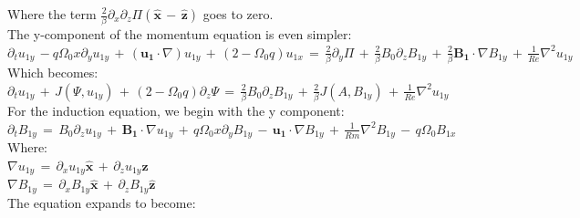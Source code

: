 \documentclass[letterpaper,12pt]{article}
\newcommand\reye{\mathrel{Re}}
\newcommand\reym{\mathrel{Rm}}
\begin{document}
Where the term $\frac{2}{\beta}\partial_x\partial_z\Pi \left(\mathbf{\hat{x}} \, - \, \mathbf{\hat{z}}\right)$ goes to zero. \\

The y-component of the momentum equation is even simpler: \\

$\partial_t u_{1y} \, - q\Omega_0 x \partial_y u_{1y} \, + \, \left(\mathbf{u_1} \cdot \nabla \right)u_{1y} \, + \, \left(2 - \Omega_0 q\right) u_{1x} \, = \, \frac{2}{\beta} \partial_y \Pi \, + \, \frac{2}{\beta} B_0 \partial_z B_{1y} \, + \, \frac{2}{\beta}\mathbf{B_1} \cdot \nabla B_{1y} \, + \, \frac{1}{\reye}\nabla^2 u_{1y}$ \\

Which becomes: \\

$\partial_t u_{1y} \, + \, J\left(\Psi, u_{1y}\right) \, + \, \left(2 - \Omega_0 q\right) \partial_z \Psi \, = \, \frac{2}{\beta}B_0\partial_z B_{1y} \, + \, \frac{2}{\beta} J\left(A, B_{1y}\right) \, + \, \frac{1}{\reye} \nabla^2 u_{1y}$ \\


For the induction equation, we begin with the y component: \\

$\partial_t B_{1y} \, = \, B_0 \partial_z u_{1y} \, + \, \mathbf{B_1} \cdot \nabla u_{1y} \, + \, q \Omega_0x\partial_y B_{1y} \, - \, \mathbf{u_1} \cdot \nabla B_{1y} \, + \, \frac{1}{\reym} \nabla^2 B_{1y} \, - \, q\Omega_0 B_{1x} \,$ \\

Where: \\

$\nabla u_{1y} \, = \, \partial_x u_{1y} \mathbf{\hat{x}} \, + \, \partial_z u_{1y}\mathbf{\hat{z}}$ \\

$\nabla B_{1y} \, = \, \partial_x B_{1y}\mathbf{\hat{x}} \, + \, \partial_z B_{1y}\mathbf{\hat{z}}$ \\

The equation expands to become: \\
\end{document}
